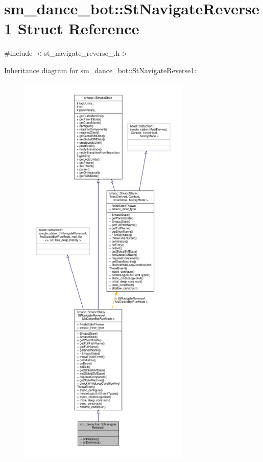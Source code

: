 \hypertarget{structsm__dance__bot_1_1StNavigateReverse1}{}\section{sm\+\_\+dance\+\_\+bot\+:\+:St\+Navigate\+Reverse1 Struct Reference}
\label{structsm__dance__bot_1_1StNavigateReverse1}


{\ttfamily \#include $<$st\+\_\+navigate\+\_\+reverse\+\_.\+h$>$}



Inheritance diagram for sm\+\_\+dance\+\_\+bot\+:\+:St\+Navigate\+Reverse1\+:\nopagebreak
\begin{figure}[H]
\begin{center}
\leavevmode
\includegraphics[height=550pt]{structsm__dance__bot_1_1StNavigateReverse1__inherit__graph}
\end{center}
\end{figure}


